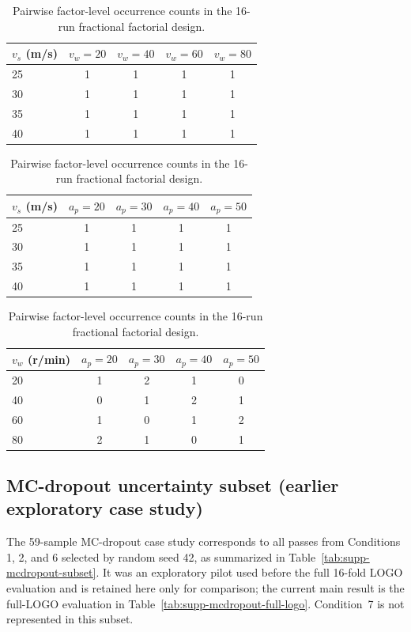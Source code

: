 \begin{table}[htbp]
\centering
\caption{Pairwise factor-level occurrence counts in the 16-run
fractional factorial design.}\label{tab:supp-balance}
\begin{tabular}{@{}lcccc@{}}
\toprule
$v_s$ (m/s) & $v_w=20$ & $v_w=40$ & $v_w=60$ & $v_w=80$ \\
\midrule
25 & 1 & 1 & 1 & 1 \\
30 & 1 & 1 & 1 & 1 \\
35 & 1 & 1 & 1 & 1 \\
40 & 1 & 1 & 1 & 1 \\
\bottomrule
\end{tabular}
\vspace{0.5em}

\begin{tabular}{@{}lcccc@{}}
\toprule
$v_s$ (m/s) & $a_p=20$ & $a_p=30$ & $a_p=40$ & $a_p=50$ \\
\midrule
25 & 1 & 1 & 1 & 1 \\
30 & 1 & 1 & 1 & 1 \\
35 & 1 & 1 & 1 & 1 \\
40 & 1 & 1 & 1 & 1 \\
\bottomrule
\end{tabular}
\vspace{0.5em}

\begin{tabular}{@{}lcccc@{}}
\toprule
$v_w$ (r/min) & $a_p=20$ & $a_p=30$ & $a_p=40$ & $a_p=50$ \\
\midrule
20 & 1 & 2 & 1 & 0 \\
40 & 0 & 1 & 2 & 1 \\
60 & 1 & 0 & 1 & 2 \\
80 & 2 & 1 & 0 & 1 \\
\bottomrule
\end{tabular}
\end{table}

\subsection*{MC-dropout uncertainty subset (earlier exploratory case study)}

The 59-sample MC-dropout case study corresponds to all passes from
Conditions 1, 2, and 6 selected by random seed 42, as summarized in Table~\ref{tab:supp-mcdropout-subset}. It was an exploratory
pilot used before the full 16-fold LOGO evaluation and is retained here
only for comparison; the current main result is the full-LOGO evaluation
in Table~\ref{tab:supp-mcdropout-full-logo}. Condition~7 is not
represented in this subset.

